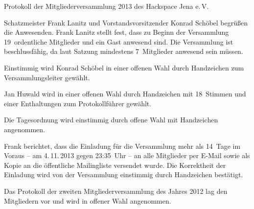 \documentclass[ngerman]{scrartcl}
\begin{document}
\begin{Protokoll}{Protokoll der Mitgliederversammlung 2013 des Hackspace
    Jena e.\,V.}


\protokollKopf


Schatzmeister Frank Lanitz und Vorstandsvorsitzender Konrad Schöbel
begrüßen die Anwesenden.  Frank Lanitz stellt fest, dass zu Beginn der
Versammlung 19~ordentliche Mitglieder und ein Gast anwesend sind. Die
Versammlung ist beschlussfähig, da laut Satzung mindestens
7~Mitglieder anwesend sein müssen.



  Einstimmig wird Konrad Schöbel in einer offenen Wahl durch
  Handzeichen zum Versammlungsleiter gewählt.


  Jan Huwald wird in einer offenen Wahl durch Handzeichen mit
  18~Stimmen und einer Enthaltungen zum Protokollführer gewählt.
  \begin{Abstimmung}
  \end{Abstimmung}


Die Tagesordnung wird einstimmig durch offene Wahl mit Handzeichen
angenommen.

Frank berichtet, dass die Einladung für die Versammlung mehr als
14~Tage im Voraus -- am 4.\,11.\,2013 gegen 23:35~Uhr -- an alle
Mitglieder per E-Mail sowie als Kopie an die öffentliche Mailingliste
versendet wurde.  Die Korrektheit der Einladung wird von der
Versammlung einstimmig durch Handzeichen bestätigt.


Das Protokoll der zweiten Mitgliederversammlung des Jahres 2012 lag
den Mitgliedern vor und wird in offener Wahl angenommen.
\begin{Abstimmung}
\end{Abstimmung}



\end{Protokoll}
\end{document}
